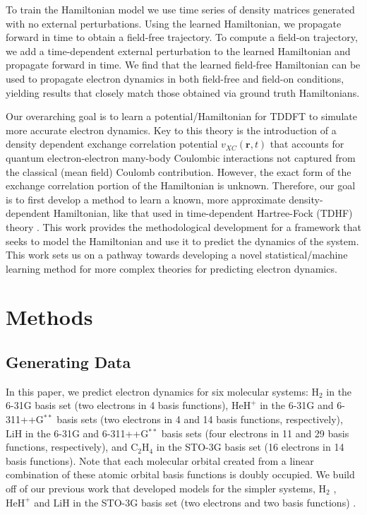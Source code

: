 \documentclass[10pt]{article}
\newcommand{\htwo}{\ensuremath{\text{H}_2} }
\newcommand{\heh}{\ensuremath{\text{HeH}^+} }
\newcommand{\lih}{\ensuremath{\text{LiH}} }
\newcommand{\ethylene}{\ensuremath{\text{C}_2\text{H}_4} }
\begin{document}
To train the Hamiltonian model we use time series of density matrices generated with no external perturbations. Using the learned Hamiltonian, we propagate forward in time to obtain a field-free trajectory. To compute a field-on trajectory, we add a time-dependent external perturbation to the learned Hamiltonian and propagate forward in time.  We find that the learned field-free Hamiltonian can be used to propagate electron dynamics in both field-free and field-on conditions, yielding results that closely match those obtained via ground truth Hamiltonians.

Our overarching goal is to learn a potential/Hamiltonian for TDDFT to simulate more accurate electron dynamics. Key to this theory is the introduction of a density dependent exchange correlation potential $v_{XC}(\mathbf{r},t)$ that accounts for quantum electron-electron many-body Coulombic interactions not captured from the classical (mean field) Coulomb contribution. However, the exact form of the exchange correlation portion of the Hamiltonian is unknown. Therefore, our goal is to first develop a method to learn a known, more approximate density-dependent Hamiltonian, like  that used in time-dependent Hartree-Fock (TDHF) theory \cite{Rubio11_book, Isborn16_739, Maitra16_220901,LiGovind2020}. This work provides the methodological development for a framework that seeks to model the Hamiltonian and use it to predict the dynamics of the system. This work sets us on a pathway towards developing a novel statistical/machine learning method for more complex theories for predicting electron dynamics.


\section{Methods}\label{sec2}


\subsection{Generating Data}
In this paper, we predict electron dynamics for six molecular systems: \htwo in the 6-31G basis set (two electrons in 4 basis functions), \heh in the 6-31G and 6-311++G$^{**}$ basis sets (two electrons in 4 and 14 basis functions, respectively), \lih in the 6-31G and 6-311++G$^{**}$ basis sets (four electrons in 11 and 29 basis functions, respectively), and \ethylene in the STO-3G basis set (16 electrons in 14 basis functions). Note that each molecular orbital created from a linear combination of these atomic orbital basis functions is doubly occupied. We build off of our previous work that developed models for the simpler systems, \htwo, \heh and \lih in the STO-3G basis set (two electrons and two basis functions) \cite{bhat2020machine}.
\end{document}
